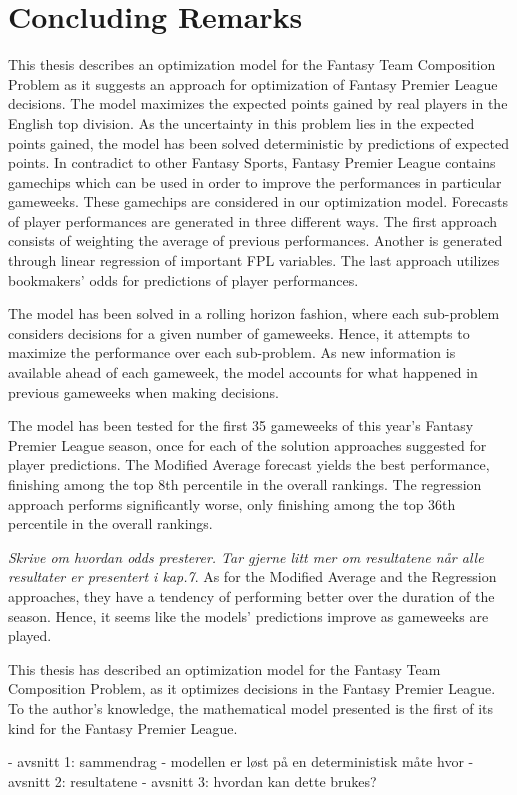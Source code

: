 \chapter{Concluding Remarks}

This thesis describes an optimization model for the Fantasy Team Composition Problem as it suggests an approach for optimization of Fantasy Premier League decisions. The model maximizes the expected points gained by real players in the English top division. As the uncertainty in this problem lies in the expected points gained, the model has been solved deterministic by predictions of expected points. In contradict to other Fantasy Sports, Fantasy Premier League contains gamechips which can be used in order to improve the performances in particular gameweeks. These gamechips are considered in our optimization model. Forecasts of player performances are generated in three different ways. The first approach consists of weighting the average of previous performances. Another is generated through linear regression of important FPL variables. The last approach utilizes bookmakers' odds for predictions of player performances. 

\newpar

The model has been solved in a rolling horizon fashion, where each sub-problem considers decisions for a given number of gameweeks. Hence, it attempts to maximize the performance over each sub-problem. As new information is available ahead of each gameweek, the model accounts for what happened in previous gameweeks when making decisions. 
\newpar

The model has been tested for the first 35 gameweeks of this year's Fantasy Premier League season, once for each of the solution approaches suggested for player predictions. The Modified Average forecast yields the best performance, finishing among the top 8th percentile in the overall rankings. The regression approach performs significantly worse, only finishing among the top 36th percentile in the overall rankings. 
\newpar

\textit{Skrive om hvordan odds presterer. Tar gjerne litt mer om resultatene når alle resultater er presentert i kap.7}. As for the Modified Average and the Regression approaches, they have a tendency of performing better over the duration of the season. Hence, it seems like the models' predictions improve as gameweeks are played. 

\begin{comment}
- computational study tyder på at performance i siste delen av 2016 ikke er en indikator på performance i første delen av sesongen i 2017/2018
\end{comment}


This thesis has described an optimization model for the Fantasy Team Composition Problem, as it optimizes decisions in the Fantasy Premier League. To the author's knowledge, the mathematical model presented is the first of its kind for the Fantasy Premier League.  

- avsnitt 1: sammendrag 
    - modellen er løst på en deterministisk måte hvor 
- avsnitt 2: resultatene 
- avsnitt 3: hvordan kan dette brukes? 